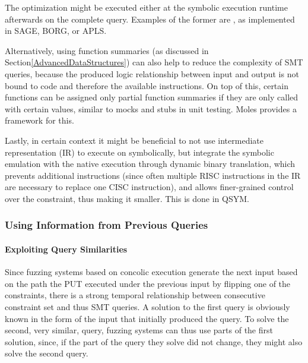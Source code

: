 \documentclass{article}
\begin{document}
\begin{multicols}{2}
    The optimization might be executed either at the symbolic execution runtime afterwards on the complete query. Examples of the former are \cite{Science}, as implemented in SAGE\cite{SAGE}, BORG\cite{BORG}, or APLS\cite{APLS}.

    Alternatively, using function summaries (as discussed in Section\ref{AdvancedDataStructures}) can also help to reduce the complexity of SMT queries, because the produced logic relationship between input and output is not bound to code and therefore the available instructions. On top of this, certain functions can be assigned only partial function summaries if they are only called with certain values, similar to mocks and stubs in unit testing. Moles\cite{Moles} provides a framework for this.

    Lastly, in certain context it might be beneficial to not use intermediate representation (IR) to execute on symbolically, but integrate the symbolic emulation with the native execution through dynamic binary translation, which prevents additional instructions (since often multiple RISC instructions in the IR are necessary to replace one CISC instruction), and allows finer-grained control over the constraint, thus making it smaller. This is done in QSYM\cite{QSYM}.

    \subsubsection{Using Information from Previous Queries}
    \paragraph{Exploiting Query Similarities} Since fuzzing systems based on concolic execution generate the next input based on the path the PUT executed under the previous input by flipping one of the constraints, there is a strong temporal relationship between consecutive constraint set and thus SMT queries. A solution to the first query is obviously known in the form of the input that initially produced the query. To solve the second, very similar, query, fuzzing systems can thus use parts of the first solution, since, if the part of the query they solve did not change, they might also solve the second query.


\end{multicols}
\end{document}
